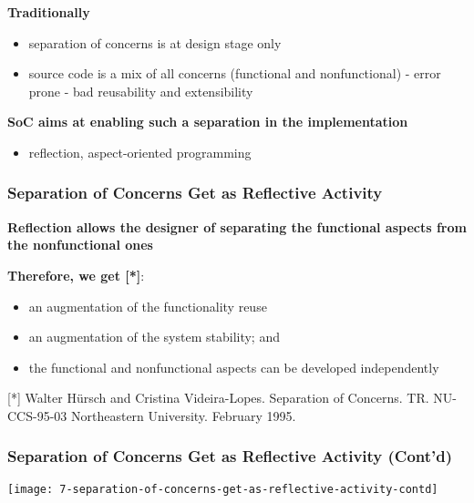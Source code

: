 \textbf{Traditionally}

\begin{itemize}
	\item separation of concerns is at design stage only
	\item source code is a mix of all concerns (functional and nonfunctional)
		- error prone
		- bad reusability and extensibility
\end{itemize}

\textbf{SoC aims at enabling such a separation in the implementation}

\begin{itemize}
	\item reflection, aspect-oriented programming
\end{itemize}

\subsubsection{Separation of Concerns Get as Reflective Activity}

\textbf{Reflection allows the designer of separating the functional aspects from the nonfunctional ones}

\textbf{Therefore, we get [*]}:
\begin{itemize}
	\item an augmentation of the functionality reuse
	\item an augmentation of the system stability; and
	\item the functional and nonfunctional aspects can be developed independently
\end{itemize}

[*] Walter Hürsch and Cristina Videira-Lopes. Separation of Concerns. TR. NU-CCS-95-03 Northeastern University. February 1995.

\subsubsection{Separation of Concerns Get as Reflective Activity (Cont'd)}

\begin{center}
\texttt{[image: 7-separation-of-concerns-get-as-reflective-activity-contd]}
\end{center}















